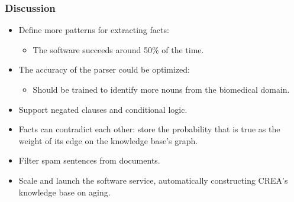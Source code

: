 \documentclass[mathserif]{beamer}
\begin{document}
  \begin{frame}

    \frametitle{Discussion}

    \begin{itemize}[<+->]

       \item Define more patterns for extracting facts:
       \begin{itemize}[<+->]

          \item The software succeeds around 50\% of the time.

       \end{itemize}

       \item The accuracy of the parser could be optimized:
       \begin{itemize}[<+->]

          \item Should be trained to identify more nouns from the biomedical
          domain.

       \end{itemize}

       \item Support negated clauses and conditional logic.

       \item Facts can contradict each other: store the probability that
       is true as the weight of its edge on the knowledge base's graph.

       \item Filter spam sentences from documents.

       \item Scale and launch the software service, automatically
       constructing CREA's knowledge base on aging.

    \end{itemize}

  \end{frame}
\end{document}

